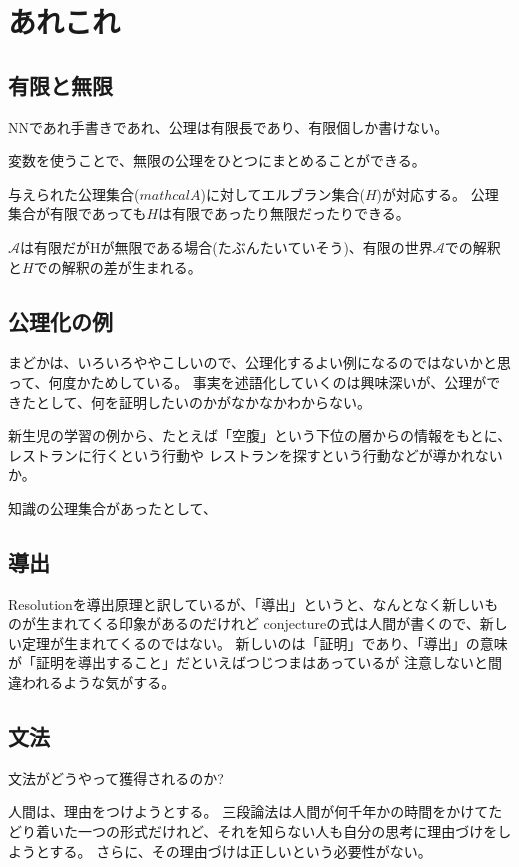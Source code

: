 \documentclass[10pt, oneside]{jarticle}   	%
\begin{document}
\section{あれこれ}
\subsection{有限と無限}
NNであれ手書きであれ、公理は有限長であり、有限個しか書けない。

変数を使うことで、無限の公理をひとつにまとめることができる。

与えられた公理集合($mathcal{A}$)に対してエルブラン集合($H$)が対応する。
公理集合が有限であっても$H$は有限であったり無限だったりできる。

$\mathcal{A}$は有限だがHが無限である場合(たぶんたいていそう)、有限の世界$\mathcal{A}$での解釈と$H$での解釈の差が生まれる。

\subsection{公理化の例}
まどかは、いろいろややこしいので、公理化するよい例になるのではないかと思って、何度かためしている。
事実を述語化していくのは興味深いが、公理ができたとして、何を証明したいのかがなかなかわからない。

新生児の学習の例から、たとえば「空腹」という下位の層からの情報をもとに、レストランに行くという行動や
レストランを探すという行動などが導かれないか。

知識の公理集合があったとして、

\subsection{導出}
Resolutionを導出原理と訳しているが、「導出」というと、なんとなく新しいものが生まれてくる印象があるのだけれど
conjectureの式は人間が書くので、新しい定理が生まれてくるのではない。
新しいのは「証明」であり、「導出」の意味が「証明を導出すること」だといえばつじつまはあっているが
注意しないと間違われるような気がする。

\subsection{文法}
文法がどうやって獲得されるのか?

人間は、理由をつけようとする。
三段論法は人間が何千年かの時間をかけてたどり着いた一つの形式だけれど、それを知らない人も自分の思考に理由づけをしようとする。
さらに、その理由づけは正しいという必要性がない。
\end{document}
